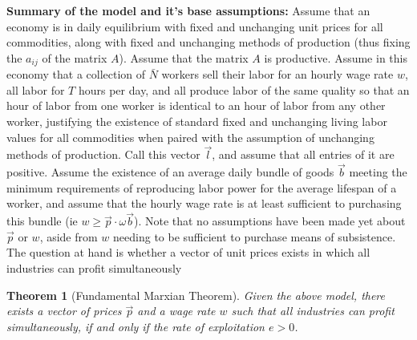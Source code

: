 \documentclass{article}
\theoremstyle{definition}
\theoremstyle{plain}
\theoremstyle{theorem}
\newtheorem{theorem}{Theorem}[section]
\begin{document}
\textbf{Summary of the model and it's base assumptions:} 
 Assume that an economy is in daily equilibrium with fixed and unchanging unit prices for all commodities, along with fixed and unchanging methods of production (thus fixing the $a_{ij}$ of the matrix $A$). Assume that the matrix $A$ is productive. Assume in this economy that a collection of $\bar{N}$ workers sell their labor for an hourly wage rate $w$, all labor for $T$ hours per day, and all produce labor of the same quality so that an hour of labor from one worker is identical to an hour of labor from any other worker, justifying the existence of standard fixed and unchanging living labor values for all commodities when paired with the assumption of unchanging methods of production. Call this vector $\vec{l}$, and assume that all entries of it are positive. Assume the existence of an average daily bundle of goods $\vec{b}$ meeting the minimum requirements of reproducing labor power for the average lifespan of a worker, and assume that the hourly wage rate is at least sufficient to purchasing this bundle (ie $w \geq \vec{p} \cdot \omega\vec{b}$). Note that no assumptions have been made yet about $\vec{p}$ or $w$, aside from $w$ needing to be sufficient to purchase means of subsistence. The question at hand is whether a vector of unit prices exists in which all industries can profit simultaneously 
\begin{theorem}[Fundamental Marxian Theorem]
	Given the above model, there exists a vector of prices $\vec{p}$ and a wage rate $w$ such that all industries can profit simultaneously, if and only if the rate of exploitation $e > 0$.
\end{theorem}
\end{document}
